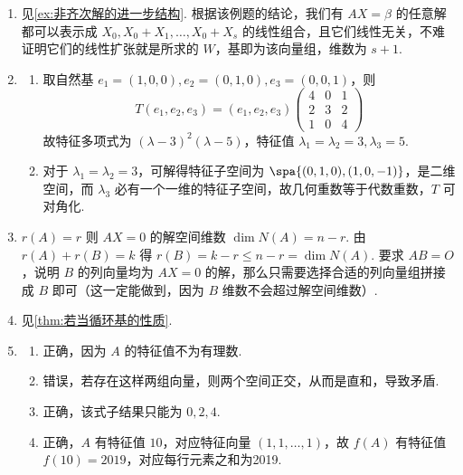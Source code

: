 \begin{enumerate}
    \item 见\autoref{ex:非齐次解的进一步结构}. 根据该例题的结论，我们有 $AX=\beta$ 的任意解都可以表示成 $X_0, X_0+X_1, \ldots, X_0+X_s$ 的线性组合，且它们线性无关，不难证明它们的线性扩张就是所求的 $W$，基即为该向量组，维数为 $s+1$.

    \item \begin{enumerate}
        \item 取自然基 $e_1=(1,0,0), e_2=(0,1,0), e_3=(0,0,1)$，则 \[ T(e_1,e_2,e_3) = (e_1, e_2, e_3)\begin{pmatrix} 4&0&1 \\ 2&3&2 \\ 1&0&4 \end{pmatrix} \] 故特征多项式为 $(\lambda-3)^{2}(\lambda-5)$，特征值 $\lambda_{1}=\lambda_{2}=3, \lambda_{3}=5$.
        \item 对于 $\lambda_1=\lambda_2=3$，可解得特征子空间为 $\spa\{(0,1,0), (1,0,-1)\}$，是二维空间，而 $\lambda_3$ 必有一个一维的特征子空间，故几何重数等于代数重数，$T$ 可对角化.
    \end{enumerate}

    \item $r(A)=r$ 则 $AX=0$ 的解空间维数 $\dim N(A) = n-r$. 由 $r(A)+r(B)=k$ 得 $r(B)=k-r \leqslant n-r=\dim N(A)$. 要求 $AB=O$，说明 $B$ 的列向量均为 $AX=0$ 的解，那么只需要选择合适的列向量组拼接成 $B$ 即可（这一定能做到，因为 $B$ 维数不会超过解空间维数）.

    \item 见\autoref{thm:若当循环基的性质}.

    \item \begin{enumerate}
        \item 正确，因为 $A$ 的特征值不为有理数.
        \item 错误，若存在这样两组向量，则两个空间正交，从而是直和，导致矛盾.
        \item 正确，该式子结果只能为 $0,2,4$.
        \item 正确，$A$ 有特征值 $10$，对应特征向量 $(1,1,\dots,1)$，故 $f(A)$ 有特征值 $f(10)=2019$，对应每行元素之和为2019.
    \end{enumerate}
\end{enumerate}

\clearpage
